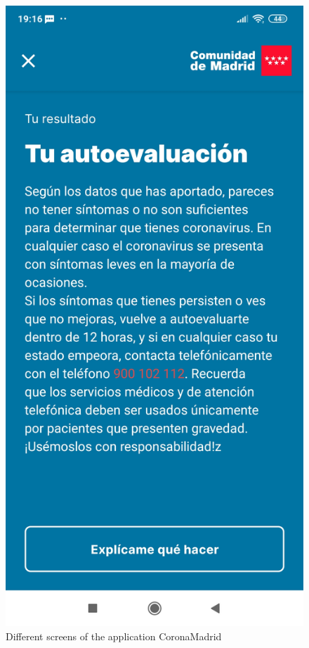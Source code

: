 \documentclass[a4paper, 12pt]{article}
\begin{document}
\begin{figure}[!htb]
\begin{minipage}{0.33\textwidth}
   \end{minipage}
   \begin{minipage}{0.33\textwidth}
     \centering
     \includegraphics[scale=0.06]{images/discussion/coronamadrid-3.jpg}
   \end{minipage}
   \caption{Different screens of the application CoronaMadrid}
   \label{fig:coronamadrid}
\end{figure}
\end{document}
